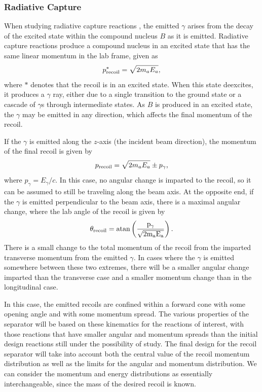 \subsubsection{Radiative Capture}
When studying radiative capture reactions , the emitted
$\gamma$ arises from the decay of the excited state within the compound nucleus
$B$ as it is emitted. Radiative capture reactions produce a compound nucleus in
an excited state that
has the same linear momentum in the lab frame, given as
\[
    p^*_{\rm{recoil}} = \sqrt{2m_aE_a},
\]
where $*$ denotes that the recoil is in an excited state. When this state
deexcites, it produces a $\gamma$ ray, either due to a single transition to
the ground state or a cascade of $\gamma$s through intermediate states. As $B$
is produced in an excited state, the $\gamma$ may be emitted in any direction,
which affects the final momentum of the recoil.

If the $\gamma$ is emitted along the $z$-axis (the incident beam direction),
the momentum of the final recoil is given by
\[
    p_{\rm{recoil}} = \sqrt{2m_aE_a} \pm p_{\gamma},
\]
where $p_{\gamma} = E_{\gamma}/c$. In this case, no angular change is imparted
to the recoil, so it can be assumed to still be traveling along the beam axis.
At the opposite end, if the $\gamma$ is emitted perpendicular to the beam axis,
there is a maximal angular change, where the lab angle of the recoil is
given by
\[
    \theta_{\rm{recoil}} = \rm{atan}\left(\frac{p_{\gamma}}{\sqrt{2m_aE_a}}\right).
\]
There is a small change to the total momentum of the recoil from the imparted
transverse momentum from the emitted $\gamma$. In cases where the $\gamma$ is
emitted somewhere between these two extremes, there will be a smaller angular
change imparted than the transverse case and a smaller momentum change than in
the longitudinal case.

In this case, the emitted recoils are confined within a forward cone with
some opening angle and with some momentum spread. The various properties of
the separator will be based on these kinematics for the reactions of interest,
with those reactions that have smaller angular and momentum spreads than the
initial design reactions still under the possibility of study. The final design
for the recoil separator will take into account both the central value of the
recoil momentum distribution as well as the limits for the angular and momentum
distribution. We can consider the momentum and energy distributions as
essentially interchangeable, since the mass of the desired recoil is known.

